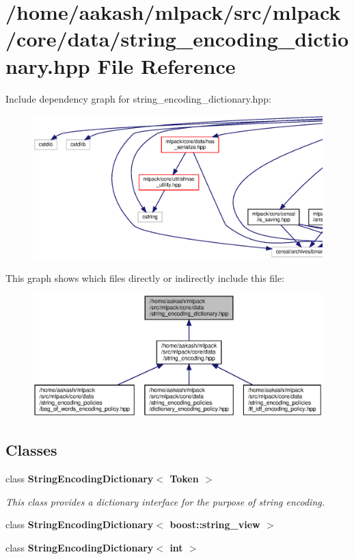 \section{/home/aakash/mlpack/src/mlpack/core/data/string\+\_\+encoding\+\_\+dictionary.hpp File Reference}
\label{string__encoding__dictionary_8hpp}
Include dependency graph for string\+\_\+encoding\+\_\+dictionary.\+hpp\+:
\nopagebreak
\begin{figure}[H]
\begin{center}
\leavevmode
\includegraphics[width=350pt]{string__encoding__dictionary_8hpp__incl}
\end{center}
\end{figure}
This graph shows which files directly or indirectly include this file\+:
\nopagebreak
\begin{figure}[H]
\begin{center}
\leavevmode
\includegraphics[width=350pt]{string__encoding__dictionary_8hpp__dep__incl}
\end{center}
\end{figure}
\subsection*{Classes}
\begin{DoxyCompactItemize}
\item 
class \textbf{ String\+Encoding\+Dictionary$<$ Token $>$}
\begin{DoxyCompactList}\small\item\em This class provides a dictionary interface for the purpose of string encoding. \end{DoxyCompactList}\item 
class \textbf{ String\+Encoding\+Dictionary$<$ boost\+::string\+\_\+view $>$}
\item 
class \textbf{ String\+Encoding\+Dictionary$<$ int $>$}
\end{DoxyCompactItemize}
